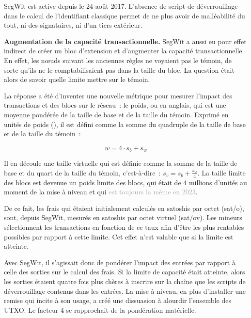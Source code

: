 SegWit est active depuis le 24 août 2017. L'absence de script de déverrouillage dans le calcul de l'identifiant classique permet de ne plus avoir de malléabilité du tout, ni des signataires, ni d'un tiers extérieur.

\textbf{Augmentation de la capacité transactionnelle.} SegWit a aussi eu pour effet indirect de créer un bloc d'extension et d'augmenter la capacité transactionnelle. En effet, les nœuds suivant les anciennes règles ne voyaient pas le témoin, de sorte qu'ils ne le comptabilisaient pas dans la taille du bloc. La question était alors de savoir quelle limite mettre sur le témoin.

La réponse a été d'inventer une nouvelle métrique pour mesurer l'impact des transactions et des blocs sur le réseau~: le poids, ou  en anglais, qui est une moyenne pondérée de la taille de base et de la taille du témoin. Exprimé en unités de poids (), il est défini comme la somme du quadruple de la taille de base et de la taille du témoin~:

{ \small
\[
w = 4 \cdot s_b + s_w
\]
}

Il en découle une taille virtuelle qui est définie comme la somme de la taille de base et du quart de la taille du témoin, c'est-à-dire~: $s_v = s_b + \frac{s_w}{4}$. La taille limite des blocs est devenue un poids limite des blocs, qui était de 4 millions d'unités au moment de la mise à niveau et qui \textcolor{darkgray}{est toujours la même en 2023}.

De ce fait, les frais qui étaient initialement calculés en satoshis par octet (sat/o), sont, depuis SegWit, mesurés en satoshis par octet virtuel (sat/ov). Les mineurs sélectionnent les transactions en fonction de ce taux afin d'être les plus rentables possibles par rapport à cette limite. Cet effet n'est valable que si la limite est atteinte.

Avec SegWit, il s'agissait donc de pondérer l'impact des entrées par rapport à celle des sorties sur le calcul des frais. Si la limite de capacité était atteinte, alors les sorties étaient quatre fois plus chères à inscrire sur la chaîne que les scripts de déverrouillage contenus dans les entrées. La mise à niveau, en plus d'installer une remise qui incite à son usage, a créé une dissuasion à alourdir l'ensemble des UTXO. Le facteur 4 se rapprochait de la pondération matérielle.

